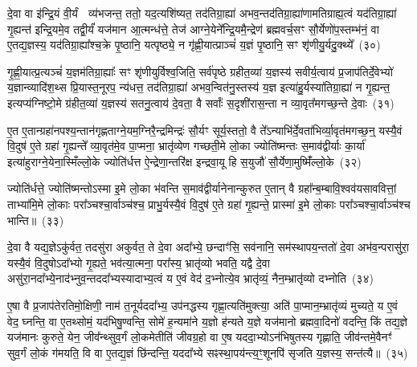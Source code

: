 {\anuvakamend[{अव॑ दाधार मि॒त्रेणै॒व प्री॑णाति॒ षट्च॑}]}%

दे॒वा वा इ॑न्द्रि॒यं वी॒र्यं  व्य॑भजन्त॒ ततो॒ यद॒त्यशि॑ष्यत॒ तद॑तिग्रा॒ह्या॑ अभव॒न्तद॑तिग्रा॒ह्या॑णामतिग्राह्य॒त्वं यद॑तिग्रा॒ह्या॑ गृ॒ह्यन्त॑ इन्द्रि॒यमे॒व तद्वी॒र्यं॑ यज॑मान आ॒त्मन्ध॑त्ते॒ तेज॑ आग्ने॒येने᳚न्द्रि॒यमै॒न्द्रेण॑ ब्रह्मवर्च॒सꣳ सौ॒र्येणो॑प॒स्तम्भ॑नं॒ वा ए॒तद्य॒ज्ञस्य॒ यद॑तिग्रा॒ह्या᳚श्च॒क्रे पृ॒ष्ठानि॒ यत्पृष्ठ्ये॒ न गृ॑ह्णी॒यात्प्राञ्चं॑ य॒ज्ञं पृ॒ष्ठानि॒ सꣳ शृ॑णीयु॒र्यदु॒क्थ्ये᳚~(३०)

गृ॒ह्णी॒यात्प्र॒त्यञ्चं॑ य॒ज्ञम॑तिग्रा॒ह्याः᳚ सꣳ शृ॑णीयुर्विश्व॒जिति॒ सर्व॑पृष्ठे ग्रहीत॒व्या॑ य॒ज्ञस्य॑ सवीर्य॒त्वाय॑ प्र॒जा\-प॑तिर्दे॒वेभ्यो॑ य॒ज्ञान्व्यादि॑श॒थ्स प्रि॒यास्त॒नूरप॒ न्य॑धत्त॒ तद॑तिग्रा॒ह्या॑ अभव॒न्वित॑नु॒स्तस्य॑ य॒ज्ञ इत्या॑हु॒र्यस्या॑तिग्रा॒ह्या॑ न गृ॒ह्यन्त॒ इत्यप्य॑ग्निष्टो॒मे ग्र॑हीत॒व्या॑ य॒ज्ञस्य॑ सतनु॒त्वाय॑ दे॒वता॒ वै सर्वाः᳚ स॒दृशी॑रास॒न्ता न व्या॒वृत᳚मगच्छ॒न्ते दे॒वाः~(३१)

ए॒त ए॒तान्ग्रहा॑नपश्य॒न्तान॑गृह्णताग्ने॒यम॒ग्निरै॒न्द्रमिन्द्रः॑ सौ॒र्यꣳ सूर्य॒स्ततो॒ वै ते᳚\-ऽन्याभि॑र्दे॒वता॑भिर्व्या॒वृत॑मगच्छ॒न्॒ यस्यै॒वं वि॒दुष॑ ए॒ते ग्रहा॑ गृ॒ह्यन्ते᳚ व्या॒वृत॑मे॒व पा॒प्मना॒ भ्रातृ॑व्येण गच्छती॒मे लो॒का ज्योति॑ष्मन्तः स॒माव॑द्वीर्याः का॒र्या॑ इत्या॑हुराग्ने॒येना॒स्मिँल्लो॒के ज्योति॑र्धत्त ऐ॒न्द्रेणा॒न्तरि॑क्ष इन्द्रवा॒यू हि स॒युजौ॑ सौ॒र्येणा॒मुष्मिँ॑ल्लो॒के~(३२)

ज्योति॑र्धत्ते॒ ज्योति॑ष्मन्तो\-ऽस्मा इ॒मे लो॒का भ॑वन्ति स॒माव॑द्वीर्यानेनान्कुरुत ए॒तान् वै ग्रहा᳚न्ब॒म्बावि॒श्वव॑यसाववित्तां॒ ताभ्या॑मि॒मे लो॒काः परा᳚ञ्चश्चा॒र्वाञ्च॑श्च॒ प्राभु॒र्यस्यै॒वं वि॒दुष॑ ए॒ते ग्रहा॑ गृ॒ह्यन्ते॒ प्रास्मा॑ इ॒मे लो॒काः परा᳚ञ्चश्चा॒र्वाञ्च॑श्च भान्ति॥~(३३)

{\anuvakamend[{उ॒क्थ्ये॑ दे॒वा अ॒मुष्मिँ॑ल्लो॒क एका॒न्नच॑त्वारि॒ꣳ॒शच्च॑}]}%

दे॒वा वै यद्य॒ज्ञे\-ऽकु॑र्वत॒ तदसु॑रा अकुर्वत॒ ते दे॒वा अदा᳚भ्ये॒ छन्दाꣳ॑सि॒ सव॑नानि॒ सम॑स्थापय॒न्ततो॑ दे॒वा अभ॑व॒न्परासु॑रा॒ यस्यै॒वं वि॒दुषो\-ऽदा᳚भ्यो गृ॒ह्यते॒ भव॑त्या॒त्मना॒ परा᳚स्य॒ भ्रातृ॑व्यो भवति॒ यद्वै दे॒वा असु॑रा॒नदा᳚भ्ये॒ना\-द॑भ्नुव॒न्तददा᳚भ्यस्यादाभ्य॒त्वं य ए॒वं वेद॑ द॒भ्नोत्ये॒व भ्रातृ॑व्यं॒ नैन॒म्भ्रातृ॑व्यो दभ्नोति~(३४)

ए॒षा वै प्र॒जा\-प॑तेरतिमो॒क्षिणी॒ नाम॑ त॒नूर्यददा᳚भ्य॒ उप॑नद्धस्य गृह्णा॒त्यति॑मुक्त्या॒ अति॑ पा॒प्मान॒म्भ्रातृ॑व्यं मुच्यते॒ य ए॒वं वेद॒ घ्नन्ति॒ वा ए॒तथ्सोमं॒ यद॑भिषु॒ण्वन्ति॒ सोमे॑ ह॒न्यमा॑ने य॒ज्ञो ह॑न्यते य॒ज्ञे यज॑मानो ब्रह्मवा॒दिनो॑ वदन्ति॒ किं तद्य॒ज्ञे यज॑मानः कुरुते॒ येन॒ जीव᳚न्थ्सुव॒र्गं लो॒कमेतीति॑ जीवग्र॒हो वा ए॒ष यददा॒भ्यो\-ऽन॑भिषुतस्य गृह्णाति॒ जीव॑न्तमे॒वैनꣳ॑ सुव॒र्गं लो॒कं ग॑मयति॒ वि वा ए॒तद्य॒ज्ञं छि॑न्दन्ति॒ यददा᳚भ्ये सꣴस्था॒पय॑न्त्य॒ꣳ॒शूनपि॑ सृजति य॒ज्ञस्य॒ सन्त॑त्यै॥~(३५)

